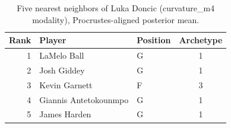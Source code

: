 \begin{table}[htbp]
  \centering\small
  \begin{tabular}{rllc}
    \toprule
    Rank & Player & Position & Archetype \\
    \midrule
    1 & LaMelo Ball & G & 1 \\
    2 & Josh Giddey & G & 1 \\
    3 & Kevin Garnett & F & 3 \\
    4 & Giannis Antetokounmpo & G & 1 \\
    5 & James Harden & G & 1 \\
    \bottomrule
  \end{tabular}
  \caption{Five nearest neighbors of Luka Doncic (curvature_m4 modality), Procrustes-aligned posterior mean.}
  \label{tab:Luka_Doncic_neighbors_curvature_m4}
\end{table}

